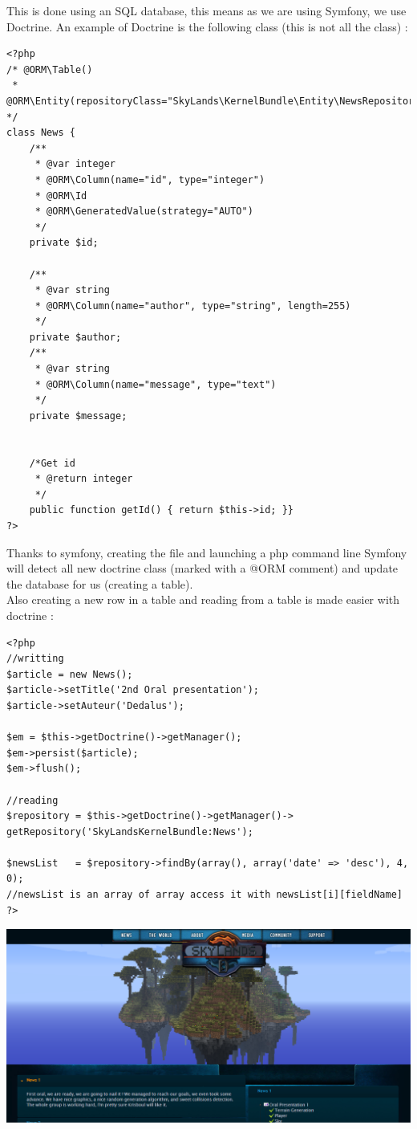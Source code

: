 \documentclass[article]{report}             %
\begin{document}
				This is done using an SQL database, this means as we are using Symfony, we use Doctrine. An example of Doctrine is the following class (this is not all the class) : 
\begin{lstlisting}
<?php
/* @ORM\Table()
 * @ORM\Entity(repositoryClass="SkyLands\KernelBundle\Entity\NewsRepository") */
class News {
    /**
     * @var integer
     * @ORM\Column(name="id", type="integer")
     * @ORM\Id
     * @ORM\GeneratedValue(strategy="AUTO")
     */
    private $id;

    /**
     * @var string
     * @ORM\Column(name="author", type="string", length=255)
     */
    private $author;
    /**
     * @var string
     * @ORM\Column(name="message", type="text")
     */
    private $message;


    /*Get id
     * @return integer 
     */
    public function getId() { return $this->id; }}
?>
\end{lstlisting}
\newpage
 		Thanks to symfony, creating the file and launching a php command line Symfony will detect all new doctrine class (marked with a @ORM comment) and update the database for us (creating a table).\\
 		Also creating a new row in a table and reading from a table is made easier with doctrine : 
\begin{lstlisting}
<?php
//writting
$article = new News();
$article->setTitle('2nd Oral presentation');
$article->setAuteur('Dedalus');

$em = $this->getDoctrine()->getManager();
$em->persist($article);
$em->flush();

//reading
$repository = $this->getDoctrine()->getManager()->
getRepository('SkyLandsKernelBundle:News');

$newsList   = $repository->findBy(array(), array('date' => 'desc'), 4, 0);
//newsList is an array of array access it with newsList[i][fieldName]
?>
\end{lstlisting}
		
						

						\includegraphics[width=16cm]{images/Graphics/web.png}
					
\end{document}
